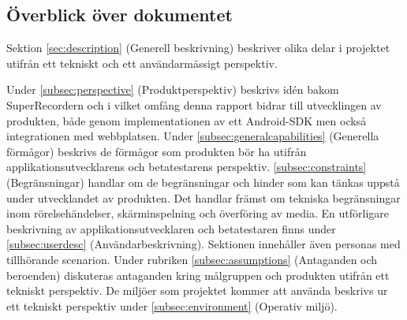 \subsection{Överblick över dokumentet}

Sektion \ref{sec:description} (Generell beskrivning) beskriver olika delar i projektet utifrån ett tekniskt och ett användarmässigt perspektiv.
 
Under \ref{subsec:perspective} (Produktperspektiv) beskrivs idén bakom SuperRecordern och i vilket omfång denna rapport bidrar till utvecklingen av produkten, både genom implementationen av ett Android-SDK men också integrationen med webbplatsen. Under \ref{subsec:generalcapabilities} (Generella förmågor) beskrivs de förmågor som produkten bör ha utifrån applikationsutvecklarens och betatestarens perspektiv. \ref{subsec:constraints} (Begränsningar) handlar om de begränsningar och hinder som kan tänkas uppstå under utvecklandet av produkten. Det handlar främst om tekniska begränsningar inom rörelsehändelser, skärminspelning och överföring av media. En utförligare beskrivning av applikationsutvecklaren och betatestaren finns under \ref{subsec:userdesc} (Användarbeskrivning). Sektionen innehåller även personas med tillhörande scenarion. Under rubriken \ref{subsec:assumptions} (Antaganden och beroenden) diskuteras antaganden kring målgruppen och produkten utifrån ett tekniskt perspektiv. De miljöer som projektet kommer att använda beskrivs ur ett tekniskt perspektiv under \ref{subsec:environment} (Operativ miljö).